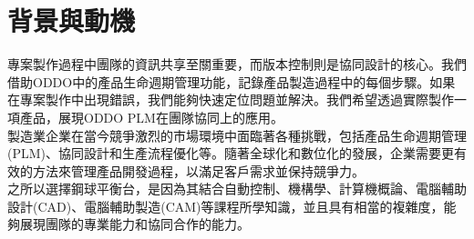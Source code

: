 \chapter{背景與動機}
\renewcommand{\baselinestretch}{10.0} %




\fontsize{14pt}{2.5pt}\sectionef\hspace{12pt}


專案製作過程中團隊的資訊共享至關重要，而版本控制則是協同設計的核心。我們借助ODDO中的產品生命週期管理功能，記錄產品製造過程中的每個步驟。如果在專案製作中出現錯誤，我們能夠快速定位問題並解決。我們希望透過實際製作一項產品，展現ODDO PLM在團隊協同上的應用。\\

 製造業企業在當今競爭激烈的市場環境中面臨著各種挑戰，包括產品生命週期管理(PLM)、協同設計和生產流程優化等。隨著全球化和數位化的發展，企業需要更有效的方法來管理產品開發過程，以滿足客戶需求並保持競爭力。\\



之所以選擇鋼球平衡台，是因為其結合自動控制、機構學、計算機概論、電腦輔助設計(CAD)、電腦輔助製造(CAM)等課程所學知識，並且具有相當的複雜度，能夠展現團隊的專業能力和協同合作的能力。\\

\newpage

\renewcommand{\baselinestretch}{0.5} %